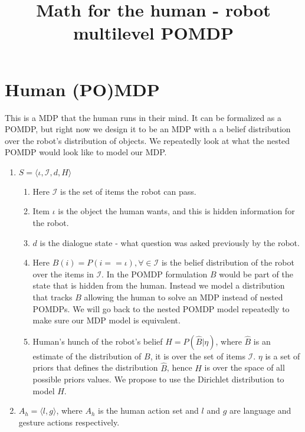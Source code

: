 \documentclass{article}
\title{Math for the human - robot multilevel POMDP}
\date{}
\begin{document}
\maketitle
\section{Human (PO)MDP}
This is a MDP that the human runs in their mind. It can be formalized as a POMDP, but right now we design it to be an MDP with a a belief distribution over the robot's distribution of objects. We repeatedly look at what the nested POMDP would look like to model our MDP.




\begin{enumerate}

	\item $S = \langle \iota, \mathcal{I}, d, H \rangle$
	\begin{enumerate}
	\item Here $\mathcal{I}$ is the set of items the robot can pass. 
	\item Item $\iota$ is the object the human wants, and this is hidden information for the robot. 
	\item $d$ is the dialogue state - what question was asked previously by the robot.
	\item Here $B(i) = P(i == \iota), \forall \in \mathcal{I}$ is the belief distribution of the robot over the items in $\mathcal{I}$. In the POMDP formulation $B$ would be part of the state that is hidden from the human. Instead we model a distribution that tracks $B$ allowing the human to solve an MDP instead of nested POMDPs. We will go back to the nested POMDP model repeatedly to make sure our MDP model is equivalent.
	
	\item Human's hunch of the robot's belief $H = P(\widehat{B}| \eta)$, where $\widehat{B}$ is an estimate of the distribution of $B$, it is over the set of items $\mathcal{I}$. $\eta$ is a set of priors that defines the distribution $\widehat{B}$, hence $H$ is over the space of all possible priors values. We propose to use the Dirichlet distribution to model $H$.  
	
	\end{enumerate}
	

	\item $A_h = \langle l,g \rangle$, where $A_h$ is the human action set and $l$ and $g$ are language and gesture actions respectively.
	

\end{enumerate}
\end{document}
